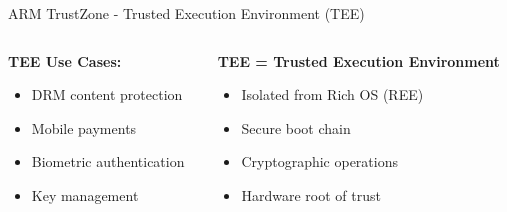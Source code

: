\documentclass[aspectratio=169,12pt]{beamer}
\begin{document}
\begin{frame}{ARM TrustZone - Trusted Execution Environment (TEE)}
    \begin{columns}
        \begin{column}{0.5\textwidth}
            \textbf{TEE Use Cases:}
            \begin{itemize}
                \item DRM content protection
                \item Mobile payments
                \item Biometric authentication
                \item Key management
            \end{itemize}
        \end{column}
        \begin{column}{0.5\textwidth}
            \textbf{TEE = Trusted Execution Environment}
            \begin{itemize}
                \item Isolated from Rich OS (REE)
                \item Secure boot chain
                \item Cryptographic operations
                \item Hardware root of trust
            \end{itemize}
        \end{column}
    \end{columns}
\end{frame}
\end{document}
